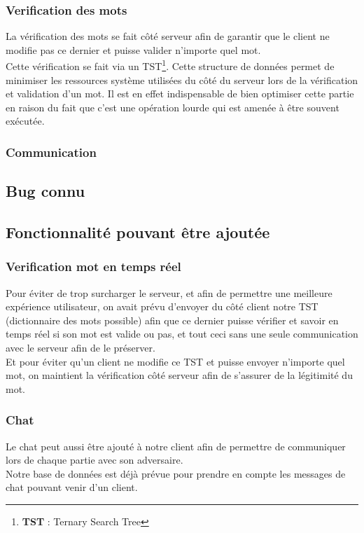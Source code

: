 \documentclass[a4paper,12pt]{article}
\begin{document}
		\subsubsection{Verification des mots}
		La vérification des mots se fait côté serveur afin de garantir que le client ne modifie pas ce dernier et puisse valider n'importe quel mot.\\
		Cette vérification se fait via un TST\footnote{\textbf{TST} : Ternary Search Tree}. Cette structure de données permet de minimiser les ressources système utilisées du côté du serveur lors de la vérification et validation d'un mot. Il est en effet indispensable de bien optimiser cette partie en raison du fait que c'est une opération lourde qui est amenée à être souvent exécutée.  
		
		
		\subsubsection{Communication}
	
		\subsection{Bug connu}
		
		\subsection{Fonctionnalité pouvant être ajoutée}
			\subsubsection{Verification mot en temps réel}
			Pour éviter de trop surcharger le serveur, et afin de permettre une meilleure expérience utilisateur, on avait prévu d'envoyer du côté client notre TST (dictionnaire des mots possible) afin que ce dernier puisse vérifier et savoir en temps réel si son mot est valide ou pas, et tout ceci sans une seule communication avec le serveur afin de le préserver. \\
			Et pour éviter qu'un client ne modifie ce TST et puisse envoyer n'importe quel mot, on maintient la vérification côté serveur afin de s'assurer de la légitimité du mot. 
			
			\subsubsection{Chat}
			Le chat peut aussi être ajouté à notre client afin de permettre de communiquer lors de chaque partie avec son adversaire.\\
			Notre base de données est déjà prévue pour prendre en compte les messages de chat pouvant venir d'un client. 
	
\end{document}
